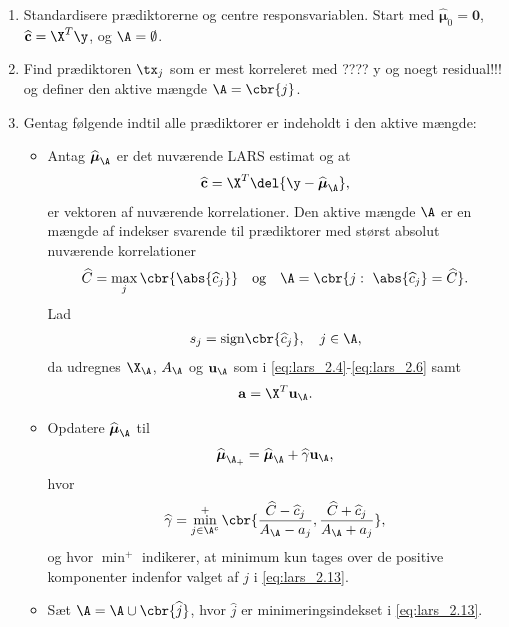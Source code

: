 \begin{alg} 
\begin{enumerate}
\item Standardisere prædiktorerne og centre responsvariablen. 
Start med \(\widehat{\boldsymbol{\mu}}_0 = \mathbf{0}\), \(\widehat{\mathbf{c}} = \X^T \y\), og \(\A = \emptyset\).
\item Find prædiktoren \(\tx_j\) som er mest korreleret med ???? y og noegt residual!!! og definer den aktive mængde \(\A = \cbr{j}\).
\item Gentag følgende indtil alle prædiktorer er indeholdt i den aktive mængde:
\begin{itemize}
\item Antag \(\widehat{\boldsymbol{\mu}}_\A\) er det nuværende LARS estimat og at
\begin{align}
\widehat{\mathbf{c}} = \X^T \del{\y - \widehat{\boldsymbol{\mu}}_\A}, \label{eq:lars_2.8}
\end{align} 
er vektoren af nuværende korrelationer.
Den aktive mængde \(\A\) er en mængde af indekser svarende til prædiktorer med størst absolut nuværende korrelationer
\begin{align}
\widehat{C} = \max_j \cbr{\abs{\widehat{c}_j}} \quad \text{og} \quad \A= \cbr{j: \ \abs{ \widehat{c}_j} = \widehat{C}}. \label{eq:lars_2.9}
\end{align}
Lad 
\begin{align*}
s_j = \text{sign} \cbr{\widehat{c}_j}, \quad j \in \A,
\end{align*}
da udregnes \(\X_\A\), \(A_\A\) og \(\mathbf{u}_\A\) som i \eqref{eq:lars_2.4}-\eqref{eq:lars_2.6} samt
\begin{align*}
\mathbf{a} = \X^T \mathbf{u}_\A.
\end{align*}
\item Opdatere \(\widehat{\boldsymbol{\mu}}_\A\) til
\begin{align}
\widehat{\boldsymbol{\mu}}_{\A_+} = \widehat{\boldsymbol{\mu}}_\A + \widehat{\gamma} \mathbf{u}_\A, \label{eq:lars_2.12}
\end{align}
hvor 
\begin{align}
\widehat{\gamma} = \min_{j \in \A^c}^+ \cbr{ \frac{\widehat{C}- \widehat{c}_j}{A_\A - a_j} , \frac{\widehat{C} + \widehat{c}_j}{A_\A + a_j}}, \label{eq:lars_2.13}
\end{align}
og hvor \(\min^+\) indikerer, at minimum kun tages over de positive komponenter indenfor valget af \(j\) i \eqref{eq:lars_2.13}.
\item Sæt \(\A = \A \cup \cbr{\widehat{j}}\), hvor \(\widehat{j}\) er minimeringsindekset i \eqref{eq:lars_2.13}.
\end{itemize}
\end{enumerate}
\end{alg}
